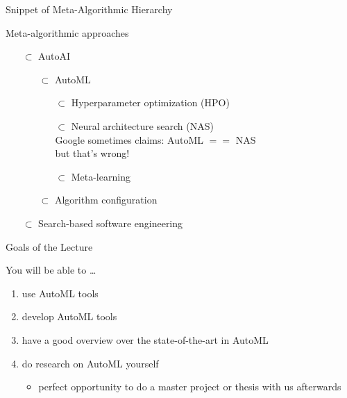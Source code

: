 \begin{frame}[c]{Snippet of Meta-Algorithmic Hierarchy}


Meta-algorithmic approaches

\begin{itemize}
  \item[$\subset$] AutoAI
  \pause
  \begin{itemize}
		\item[$\subset$] AutoML
		\pause
		\begin{itemize}
		 	\item[$\subset$] Hyperparameter optimization (HPO)
		 	\pause
		 	\item[$\subset$] Neural architecture search (NAS)\\
		 	   \hspace{1em} Google sometimes claims: AutoML $==$ NAS\\
		 	   \hspace{1em} but that's wrong!
		 	\pause
		 	\item[$\subset$] Meta-learning\\
		\end{itemize}
		\pause
		\item[$\subset$] Algorithm configuration
	\end{itemize}
	\pause
	\item[$\subset$] Search-based software engineering
\end{itemize}

\end{frame}
\begin{frame}[c]{Goals of the Lecture}

You will be able to \ldots
\begin{enumerate}
  \item use AutoML tools
  \smallskip
  \item develop AutoML tools
  \smallskip
  \item have a good overview over the state-of-the-art in AutoML
  \smallskip
  \item do research on AutoML yourself
  \begin{itemize}
    \item perfect opportunity to do a master project or thesis with us afterwards
  \end{itemize}
\end{enumerate}

\end{frame}
